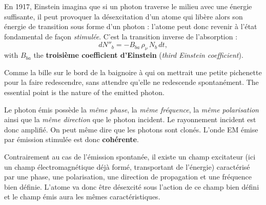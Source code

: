 \begin{definition}
  En 1917, Einstein imagina que si un photon traverse le milieu avec une énergie
  suffisante, il peut provoquer la désexcitation d'un atome qui libère alors son
  énergie de transition sous forme d'un photon : l'atome peut donc revenir à
  l'état fondamental de façon \emph{stimulée}. C'est la transition inverse de
  l'absorption :
  \[dN''_b=-B_{ba}\,\rho_\nu\,N_b\,dt,\]
  with $B_{ba}$ the \textbf{troisième coefficient d'Einstein} (\textit{third
  Einstein coefficient}).
\end{definition}

Comme la bille sur le bord de la baignoire à qui on mettrait une petite
pichenette pour la faire redescendre, sans attendre qu'elle ne redescende
spontanément. The essential point is the nature of the emitted photon.

\begin{postulate}
  Le photon émis possède la \emph{même phase}, la \emph{même fréquence}, la
  \emph{même polarisation} ainsi que la \emph{même direction} que le photon
  incident. Le rayonnement incident est donc amplifié. On peut même dire que les
  photons sont clonés. L'onde EM émise par émission stimulée est donc
  \textbf{cohérente}.
\end{postulate}

\begin{remark}
  Contrairement au cas de l'émission spontanée, il existe un champ excitateur
  (ici un champ électromagnétique déjà formé, transportant de l'énergie)
  caractérisé par une phase, une polarisation, une direction de propagation et
  une fréquence bien définie. L'atome va donc être désexcité sous l'action de ce
  champ bien défini et le champ émis aura les mêmes caractéristiques.
\end{remark}

